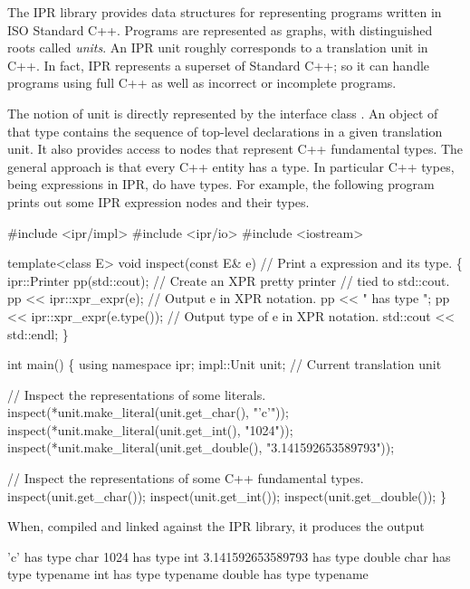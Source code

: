 \documentclass[11pt]{article}
\begin{document}
The IPR library provides data structures for representing programs written in
ISO Standard C++.  Programs are represented as graphs, with distinguished
roots called \emph{units}.  An IPR unit roughly corresponds to a translation
unit in C++.  In fact, IPR represents a superset of Standard C++; so it can
handle programs using full C++  as well as incorrect or incomplete programs. 

The notion of unit is directly represented by the interface class
. An object of that type contains the sequence of top-level
declarations in a given translation unit. It also provides  access to nodes
that represent C++ fundamental types.  The general approach is that
every C++ entity has a type.  In particular C++ types, being expressions in
IPR, do have types.  For example, the following program prints out some
IPR expression nodes and their types.
\begin{Program}
#include <ipr/impl>
#include <ipr/io>
#include <iostream>

template<class E>
void inspect(const E& e)        // Print a expression and its type.
\{
   ipr::Printer pp(std::cout);  // Create an XPR pretty printer
                                // tied to std::cout.
   pp << ipr::xpr_expr(e);      // Output e in XPR notation.
   pp << " has type ";
   pp << ipr::xpr_expr(e.type()); // Output type of e in XPR notation.
   std::cout << std::endl;
\}

int main()
\{
   using namespace ipr;
   impl::Unit unit;             // Current translation unit

   // Inspect the representations of some literals.
   inspect(*unit.make_literal(unit.get_char(), "'c'"));
   inspect(*unit.make_literal(unit.get_int(), "1024"));
   inspect(*unit.make_literal(unit.get_double(), "3.141592653589793"));

   // Inspect the representations of some C++ fundamental types.
   inspect(unit.get_char());
   inspect(unit.get_int());
   inspect(unit.get_double());
\}
\end{Program}

When, compiled and linked against the IPR library, it produces the output
\begin{Output}
'c' has type char
1024 has type int
3.141592653589793 has type double
char has type  typename
int has type  typename
double has type  typename
\end{Output}

\end{document}
